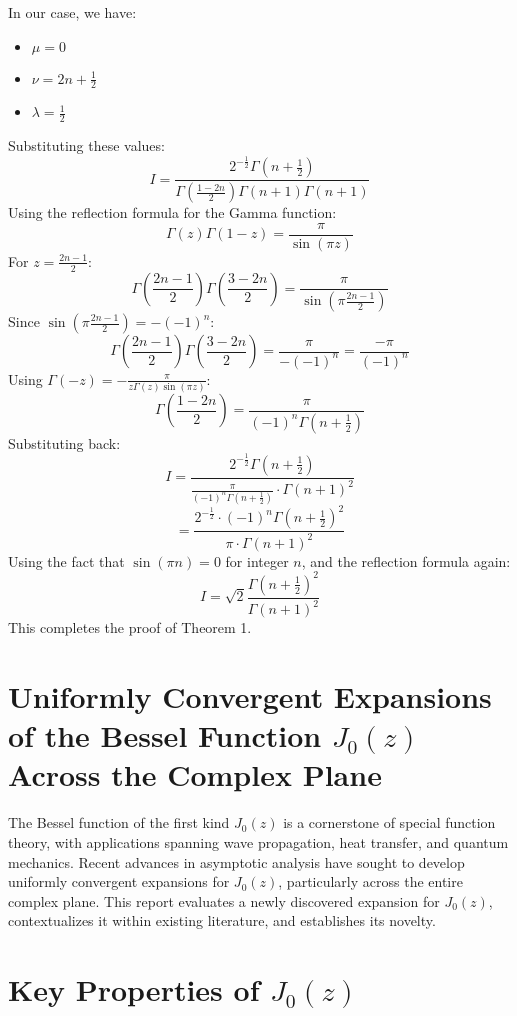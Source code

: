 \documentclass{article}
\begin{document}
In our case, we have:
\begin{itemize}
  \item $\mu = 0$
  
  \item $\nu = 2 n + \frac{1}{2}$
  
  \item $\lambda = \frac{1}{2}$
\end{itemize}
Substituting these values:
\[ I = \frac{2^{- \frac{1}{2}} \Gamma \left( n + \frac{1}{2} \right)}{\Gamma
   \left( \frac{1 - 2 n}{2} \right) \Gamma (n + 1) \Gamma (n + 1)} \]
Using the reflection formula for the Gamma function:
\[ \Gamma (z) \Gamma (1 - z) = \frac{\pi}{\sin (\pi z)} \]
For $z = \frac{2 n - 1}{2}$:
\[ \Gamma \left( \frac{2 n - 1}{2} \right) \Gamma \left( \frac{3 - 2 n}{2}
   \right) = \frac{\pi}{\sin \left( \pi \frac{2 n - 1}{2} \right)} \]
Since $\sin \left( \pi \frac{2 n - 1}{2} \right) = - (- 1)^n$:
\[ \Gamma \left( \frac{2 n - 1}{2} \right) \Gamma \left( \frac{3 - 2 n}{2}
   \right) = \frac{\pi}{- (- 1)^n} = \frac{- \pi}{(- 1)^n} \]
Using $\Gamma (- z) = - \frac{\pi}{z \Gamma (z) \sin (\pi z)}$:
\[ \Gamma \left( \frac{1 - 2 n}{2} \right) = \frac{\pi}{(- 1)^n \Gamma \left(
   n + \frac{1}{2} \right)} \]
Substituting back:
\[ I = \frac{2^{- \frac{1}{2}} \Gamma (n + \frac{1}{2})}{\frac{\pi}{(- 1)^n
   \Gamma \left( n + \frac{1}{2} \right)} \cdot \Gamma (n + 1)^2} \]
\[ = \frac{2^{- \frac{1}{2}} \cdot (- 1)^n \Gamma (n + \frac{1}{2})^2}{\pi
   \cdot \Gamma (n + 1)^2} \]
Using the fact that $\sin (\pi n) = 0$ for integer $n$, and the reflection
formula again:
\[ I = \sqrt{2}  \frac{\Gamma (n + \frac{1}{2})^2}{\Gamma (n + 1)^2} \]
This completes the proof of Theorem 1.

\section*{Uniformly Convergent Expansions of the Bessel Function $J_0 (z)$
Across the Complex Plane}

The Bessel function of the first kind $J_0 (z)$ is a cornerstone of special
function theory, with applications spanning wave propagation, heat transfer,
and quantum mechanics. Recent advances in asymptotic analysis have sought to
develop uniformly convergent expansions for $J_0 (z)$, particularly across the
entire complex plane. This report evaluates a newly discovered expansion for
$J_0 (z)$, contextualizes it within existing literature, and establishes its
novelty.

\section*{Key Properties of $J_0 (z)$}
\end{document}
